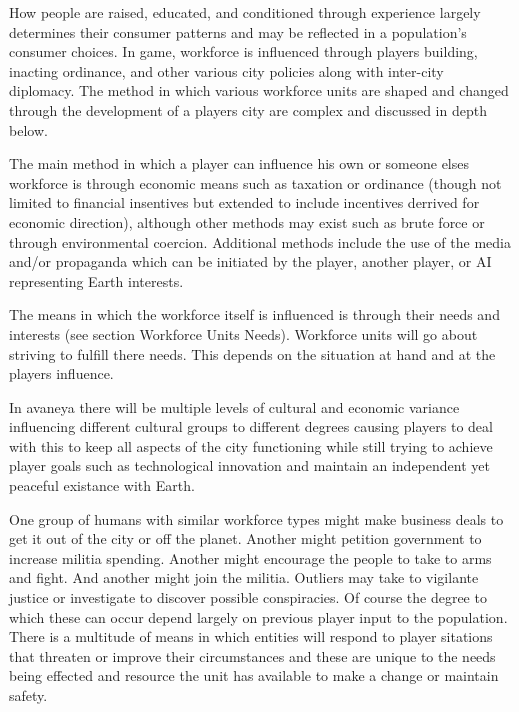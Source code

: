 

How people are raised, educated, and conditioned through experience largely determines their consumer patterns and may be reflected in a population's consumer choices. In game, workforce is influenced through players building, inacting ordinance, and other various city policies along with inter-city diplomacy. The method in which various workforce units are shaped and changed through the development of a players city are complex and discussed in depth below.

The main method in which a player can influence his own or someone elses workforce is through economic means such as taxation or ordinance (though not limited to financial insentives but extended to include incentives derrived for economic direction), although other methods may exist such as brute force or through environmental coercion. Additional methods include the use of the media and/or propaganda which can be initiated by the player, another player, or AI representing Earth interests.

The means in which the workforce itself is influenced is through their needs and interests (see section Workforce Units Needs). Workforce units will go about striving to fulfill there needs. This depends on the situation at hand and at the players influence.

In avaneya there will be multiple levels of cultural and economic variance influencing different cultural groups to different degrees causing players to deal with this to keep all aspects of the city functioning while still trying to achieve player goals such as technological innovation and maintain an independent yet peaceful existance with Earth.

One group of humans with similar workforce types might make business deals to get it out of the city or off the planet. Another might petition government to increase militia spending. Another might encourage the people to take to arms and fight. And another might join the militia. Outliers may take to vigilante justice or investigate to discover possible conspiracies. Of course the degree to which these can occur depend largely on previous player input to the population. There is a multitude of means in which entities will respond to player sitations that threaten or improve their circumstances and these are unique to the needs being effected and resource the unit has available to make a change or maintain safety.

